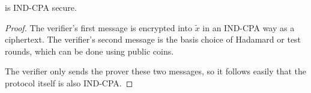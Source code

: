 \begin{thm}
	 is IND-CPA secure.
\end{thm}
\begin{proof}
	The verifier's first message is encrypted into $\tilde{x}$ in an IND-CPA way as a ciphertext.
	The verifier's second message is the basis choice of Hadamard or test rounds, which can be done using public coins.

	The verifier only sends the prover these two messages, so it follows  easily that the protocol itself is also IND-CPA. 
\end{proof}
